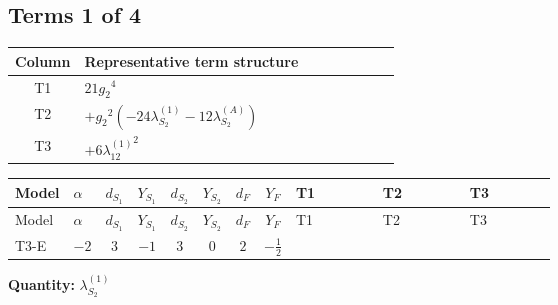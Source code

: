 \documentclass[8pt]{article}
\begin{document}
\begin{landscape}
\subsection*{Terms 1 of 4}
\begin{center}
\begin{tabular}{@{}c >{\raggedright\arraybackslash}p{0.82\linewidth}@{}}
\toprule
Column & Representative term structure \\
\midrule
T1 & \(\displaystyle 21 {g_2}^4\) \\
\midrule
T2 & \(\displaystyle +{g_2}^2 (-24 {\lambda_{S_2}^{(1)}}-12 {\lambda_{S_2}^{(A)}})\) \\
\midrule
T3 & \(\displaystyle +6 {\lambda_{12}^{(1)}}^2\) \\
\midrule
\bottomrule
\end{tabular}
\end{center}
\smallskip
\tiny
\begin{longtable}{@{}llcccccc >{\raggedright\arraybackslash}p{0.21\linewidth} >{\raggedright\arraybackslash}p{0.21\linewidth} >{\raggedright\arraybackslash}p{0.21\linewidth}@{}}
\toprule
Model & $\alpha$ & $d_{S_1}$ & $Y_{S_1}$ & $d_{S_2}$ & $Y_{S_2}$ & $d_F$ & $Y_F$ & T1 & T2 & T3 \\
\midrule
\endfirsthead
\toprule
Model & $\alpha$ & $d_{S_1}$ & $Y_{S_1}$ & $d_{S_2}$ & $Y_{S_2}$ & $d_F$ & $Y_F$ & T1 & T2 & T3 \\
\midrule
\endhead
T3-E & $-2$ & $3$ & $-1$ & $3$ & $0$ & $2$ & $-\frac{1}{2}$ & \scriptsize\adjustbox{max width=\linewidth}{$\begin{gathered} 21 {g_2}^4\end{gathered}$} & \scriptsize\adjustbox{max width=\linewidth}{$\begin{gathered} +{g_2}^2 (-24 {\lambda_{S_2}^{(1)}}-12 {\lambda_{S_2}^{(A)}})\end{gathered}$} & \scriptsize\adjustbox{max width=\linewidth}{$\begin{gathered} +6 {\lambda_{12}^{(1)}}^2\end{gathered}$} \\
\midrule
\bottomrule
\end{longtable}
\clearpage
\noindent\textbf{Quantity: }$\lambda_{S_2}^{(1)}$\par\smallskip

\end{landscape}
\end{document}
